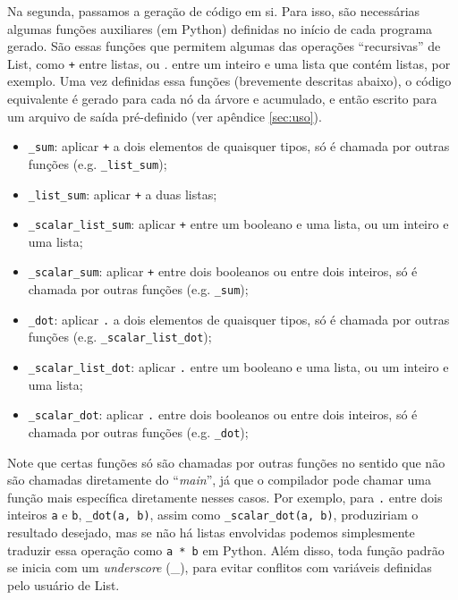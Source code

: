 \documentclass{article}
\begin{document}
Na segunda, passamos a geração de código em si. Para isso, são necessárias algumas funções auxiliares (em Python) definidas no início de cada programa gerado. São essas funções que permitem algumas das operações ``recursivas'' de List, como \texttt{+} entre listas, ou \textit{.} entre um inteiro e uma lista que contém listas, por exemplo. Uma vez definidas essa funções (brevemente descritas abaixo), o código equivalente é gerado para cada nó da árvore e acumulado, e então escrito para um arquivo de saída pré-definido (ver apêndice \ref{sec:uso}).

\begin{itemize}
\item \texttt{\_sum}: aplicar \texttt{+} a dois elementos de quaisquer tipos, só é chamada por outras funções (e.g. \texttt{\_list\_sum});
\item \texttt{\_list\_sum}: aplicar \texttt{+} a duas listas;
\item \texttt{\_scalar\_list\_sum}: aplicar \texttt{+} entre um booleano e uma lista, ou um inteiro e uma lista;
\item \texttt{\_scalar\_sum}: aplicar \texttt{+} entre dois booleanos ou entre dois inteiros, só é chamada por outras funções (e.g. \texttt{\_sum});
\item \texttt{\_dot}: aplicar \texttt{.} a dois elementos de quaisquer tipos, só é chamada por outras funções (e.g. \texttt{\_scalar\_list\_dot});
\item \texttt{\_scalar\_list\_dot}: aplicar \texttt{.} entre um booleano e uma lista, ou um inteiro e uma lista;
\item \texttt{\_scalar\_dot}: aplicar \texttt{.} entre dois booleanos ou entre dois inteiros, só é chamada por outras funções (e.g. \texttt{\_dot});
\end{itemize}

Note que certas funções só são chamadas por outras funções no sentido que não são chamadas diretamente do ``\textit{main}'', já que o compilador pode chamar uma função mais específica diretamente nesses casos. Por exemplo, para \texttt{.} entre dois inteiros \texttt{a} e \texttt{b}, \texttt{\_dot(a, b)}, assim como \texttt{\_scalar\_dot(a, b)}, produziriam o resultado desejado, mas se não há listas envolvidas podemos simplesmente traduzir essa operação como \texttt{a * b} em Python. Além disso, toda função padrão se inicia com um \textit{underscore} (\_), para evitar conflitos com variáveis definidas pelo usuário de List.
\end{document}
